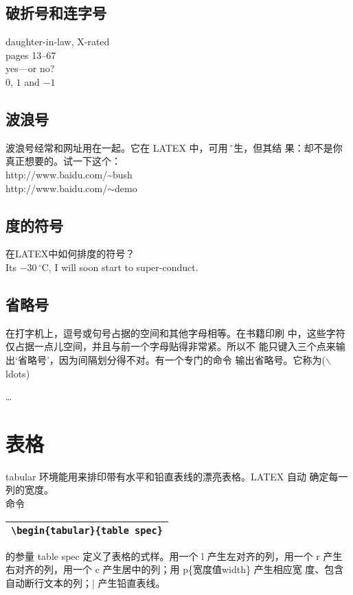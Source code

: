 \documentclass{ctexart}
\begin{document}
\subsection{破折号和连字号}
daughter-in-law, X-rated\\
pages 13--67\\
yes---or no? \\
$0$, $1$ and $-1$

\subsection{波浪号}
波浪号经常和网址用在一起。它在 LATEX 中，可用 \~ 产生，但其结
果：却不是你真正想要的。试一下这个：\\
http://www.baidu.com/\~{}bush \\
http://www.baidu.com/$\sim$demo 

\subsection{度的符号}
在LATEX中如何排度的符号？ \\
Its $-30\,^{\circ}\mathrm{C}$,
I will soon start to
super-conduct.

\subsection{省略号}
在打字机上，逗号或句号占据的空间和其他字母相等。在书籍印刷
中，这些字符仅占据一点儿空间，并且与前一个字母贴得非常紧。所以不
能只键入三个点来输出‘省略号’，因为间隔划分得不对。有一个专门的命令
输出省略号。它称为($\backslash$ldots)

\ldots

\section{表格}
tabular 环境能用来排印带有水平和铅直表线的漂亮表格。LATEX 自动
确定每一列的宽度。\\
命令\\
\begin{tabular}{|l|}
  \hline
  \verb|\begin{tabular}{table spec}| \\
  \hline
\end{tabular}

的参量 table spec 定义了表格的式样。用一个 l 产生左对齐的列，用一个 r
产生右对齐的列，用一个 c 产生居中的列；用 p\{宽度值width\} 产生相应宽
度、包含自动断行文本的列；| 产生铅直表线。
\end{document}
